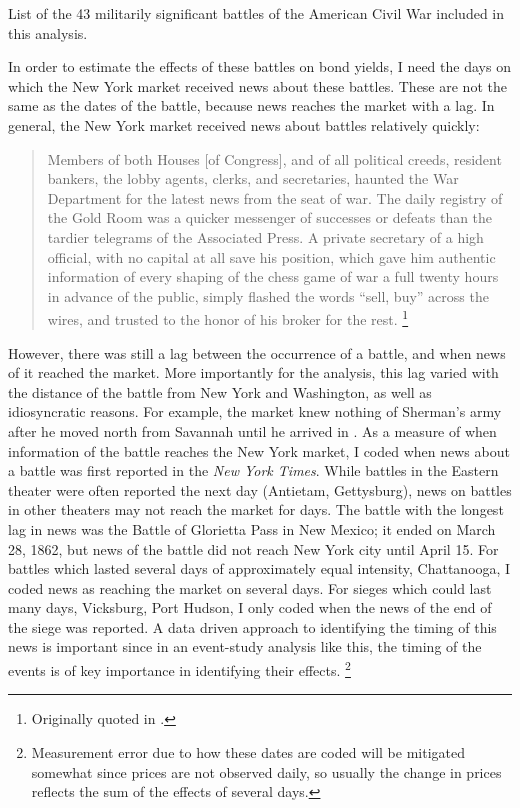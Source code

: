 \begin{table}
  \centering
  \small
  
  \caption{List of the 43 militarily significant battles of the American Civil War included in this analysis.}
  \label{bonds:tab:battles}
\end{table}

In order to estimate the effects of these battles on bond yields, I need the days on which the New York market received news about these battles.
These are not the same as the dates of the battle, because news reaches the market with a lag.
In general, the New York market received news about battles relatively quickly:
\begin{quote}
Members of both Houses [of Congress], and of all political creeds, resident bankers, the lobby agents, clerks, and secretaries, haunted the War Department for the latest news from the seat of war.
The daily registry of the Gold Room was a quicker messenger of successes or defeats than the tardier telegrams of the Associated Press. A private secretary of a high official, with no capital at all save his position, which gave him authentic information of every shaping of the chess game of war a full twenty hours in advance of the public, simply flashed the words ``sell, buy'' across the wires, and trusted to the honor of his broker for the rest. \parencite[245]{Medbery1870a}\footnote{Originally quoted in \textcite{WillardGuinnaneEtAl1996}.}
\end{quote}
However, there was still a lag between the occurrence of a battle, and when news of it reached the market.
More importantly for the analysis, this lag varied with the distance of the battle from New York and Washington, as well as idiosyncratic reasons.
For example, the market knew nothing of Sherman's army after he moved north from Savannah until he arrived in  \textcite[204]{Mitchell1903}.
As a measure of when information of the battle reaches the New York market, I coded when news about a battle was first reported in the \textit{New York Times}.
While battles in the Eastern theater were often reported the next day (Antietam, Gettysburg), news on battles in other theaters may not reach the market for days.
The battle with the longest lag in news was the Battle of Glorietta Pass in New Mexico; it ended on March 28, 1862, but news of the battle did not reach New York city until April 15.
For battles which lasted several days of approximately equal intensity, \eg{}Chattanooga, I coded news as reaching the market on several days.
For sieges which could last many days, \eg{}Vicksburg, Port Hudson, I only coded when the news of the end of the siege was reported.
A data driven approach to identifying the timing of this news is important since in an event-study analysis like this, the timing of the events is of key importance in identifying their effects.
\footnote{
  Measurement error due to how these dates are coded will be mitigated somewhat since prices are not observed daily, so usually the change in prices reflects the sum of the effects of several days.
}

